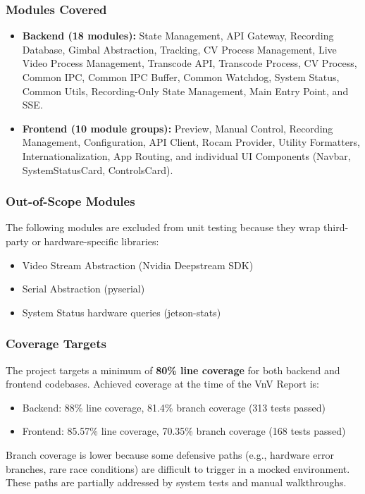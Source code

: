 \documentclass[12pt, titlepage]{article}
\begin{document}
\subsubsection*{Modules Covered}
\begin{itemize}
  \item \textbf{Backend (18 modules):}
        State Management, API Gateway, Recording Database, Gimbal
        Abstraction, Tracking, CV Process Management, Live Video Process
        Management, Transcode API, Transcode Process, CV Process, Common
        IPC, Common IPC Buffer, Common Watchdog, System Status, Common
        Utils, Recording-Only State Management, Main Entry Point, and SSE.
  \item \textbf{Frontend (10 module groups):}
        Preview, Manual Control, Recording Management, Configuration, API
        Client, Rocam Provider, Utility Formatters, Internationalization,
        App Routing, and individual UI Components (Navbar, SystemStatusCard,
        ControlsCard).
\end{itemize}

\subsubsection*{Out-of-Scope Modules}
The following modules are excluded from unit testing because they wrap
third-party or hardware-specific libraries:
\begin{itemize}
  \item Video Stream Abstraction (Nvidia Deepstream SDK)
  \item Serial Abstraction (pyserial)
  \item System Status hardware queries (jetson-stats)
\end{itemize}

\subsubsection*{Coverage Targets}
The project targets a minimum of \textbf{80\% line coverage} for both
backend and frontend codebases. Achieved coverage at the time of the VnV
Report is:
\begin{itemize}
  \item Backend: 88\% line coverage, 81.4\% branch coverage (313 tests passed)
  \item Frontend: 85.57\% line coverage, 70.35\% branch coverage (168 tests passed)
\end{itemize}
Branch coverage is lower because some defensive paths (e.g., hardware
error branches, rare race conditions) are difficult to trigger in a
mocked environment. These paths are partially addressed by system tests
and manual walkthroughs.
\end{document}
